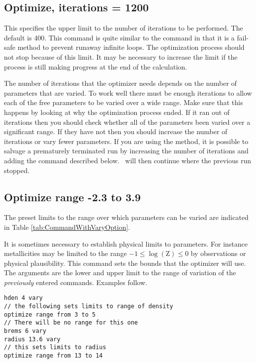 \subsection{Optimize, iterations = 1200}

This specifies the upper limit to the number of iterations to be
performed.
The default is 400.
This command is quite similar to the
 command in that it is a fail-safe
method to prevent runaway infinite
loops.
The optimization process should not stop because of this limit.
It may be necessary to increase the limit if the process is still making
progress at the end of the calculation.

The number of iterations that the optimizer needs depends on the number
of parameters that are varied.
To work well there must be enough iterations to allow
each of the free parameters to be varied over a wide range.
Make sure that
this happens by looking at why the optimization process ended.
If it ran
out of iterations then you should check whether all of the parameters been
varied over a significant range.
If they have not then you should increase
the number of iterations or vary fewer parameters.
If you are using the  method, it is possible to
salvage a prematurely terminated run by increasing the number of
iterations and adding the  command
described below.
\Cloudy\ will then continue where the previous run stopped.

\subsection{Optimize range -2.3 to 3.9}

The preset limits to the range over which parameters can be varied are
indicated in Table \ref{tab:CommandWithVaryOption}.

It is sometimes necessary to establish physical limits to parameters.
For instance metallicities may be limited to the range
$-1 \le \log(\mathrm{Z}) \le 0$ by
observations or physical plausibility.
This command sets the bounds that
the optimizer will use.
The arguments are the lower and upper limit to
the range of variation of the \emph{previously} entered  commands.
Examples follow.
\begin{verbatim}
hden 4 vary
// the following sets limits to range of density
optimize range from 3 to 5
// There will be no range for this one
brems 6 vary
radius 13.6 vary
// this sets limits to radius
optimize range from 13 to 14
\end{verbatim}

